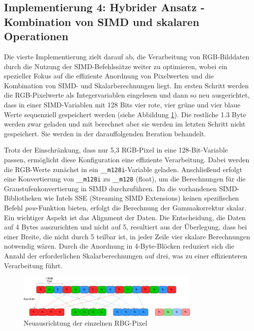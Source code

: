\documentclass[course=erap]{aspdoc}
\begin{document}
\subsection{Implementierung 4: Hybrider Ansatz - Kombination von SIMD und skalaren Operationen }

Die vierte Implementierung zielt darauf ab, die Verarbeitung von RGB-Bilddaten durch die Nutzung der SIMD-Befehlssätze weiter zu optimieren, wobei ein spezieller Fokus auf die effiziente Anordnung von Pixelwerten und die Kombination von SIMD- und Skalarberechnungen liegt. Im ersten Schritt werden die RGB-Pixelwerte als Integervariablen eingelesen und dann so neu ausgerichtet, dass in einer SIMD-Variablen mit 128 Bits vier rote, vier grüne und vier blaue Werte sequenziell gespeichert werden (siehe Abbildung \ref{fig:6}). 
Die restliche 1.3 Byte werden zwar geladen und mit berechnet aber sie werden im letzten Schritt nicht gespeichert. Sie werden in der darauffolgenden Iteration behandelt.

Trotz der Einschränkung, dass nur 5,3 RGB-Pixel in eine 128-Bit-Variable passen, ermöglicht diese Konfiguration eine effiziente Verarbeitung. 
Dabei werden die RGB-Werte zunächst in ein \texttt{\_\_m128i}-Variable geladen. Anschließend erfolgt eine Konvertierung von \texttt{\_\_m128i} zu \texttt{\_\_m128} (float), um die Berechnungen für die Graustufenkonvertierung in SIMD durchzuführen. Da die vorhandenen SIMD-Bibliotheken wie Intels SSE (Streaming SIMD Extensions)\cite{SEE} keinen spezifischen Befehl \textit{pow}-Funktion bieten, erfolgt die Berechnung der Gammakorrektur skalar.
Ein wichtiger Aspekt ist das Alignment der Daten. Die Entscheidung, die Daten auf 4 Bytes auszurichten und nicht auf 5, resultiert aus der Überlegung, dass bei einer Breite, die nicht durch 5 teilbar ist, in jeder Zeile vier skalare Berechnungen notwendig wären. Durch die Anordnung in 4-Byte-Blöcken reduziert sich die Anzahl der erforderlichen Skalarberechnungen auf drei, was zu einer effizienteren Verarbeitung führt.

\begin{figure}[h]
\centering
\includegraphics[width = 0.8\textwidth]{images/SIMD Diagramm.png}
\caption{Neuausrichtung der einzelnen RBG-Pixel}
\label{fig:6}
\end{figure}
\end{document}
